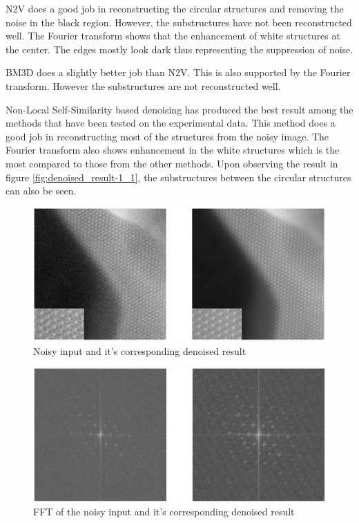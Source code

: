 \documentclass[fleqn,10pt]{wlscirep}
\begin{document}
N2V does a good job in reconstructing the circular structures and removing the noise in the black region. However, the substructures have not been reconstructed well. The Fourier transform shows that the enhancement of white structures at the center. The edges mostly look dark thus representing the suppression of noise. 

BM3D does a slightly better job than N2V. This is also supported by the Fourier transform. However the substructures are not reconstructed well. 

Non-Local Self-Similarity based denoising has produced the best result among the methods that have been tested on the experimental data. This method does a good job in reconstructing most of the structures from the noisy image. The Fourier transform also shows enhancement in the white structures which is the most compared to those from the other methods. Upon observing the result in figure \ref{fig:denoised_result-1_1}, the substructures between the circular structures can also be seen. 


\begin{figure}
	\centering
	\includegraphics[scale=0.5]{./imgs/denoised_result-1.png}
	\caption[Non-Local Self-Similarity based image denoising result]{Noisy input and it's corresponding denoised result}
	\label{fig:denoised_result-1}
\end{figure}

\begin{figure}
	\centering
	\includegraphics[scale=0.55]{./imgs/denoised_result_fft-1.png}
	\caption[FFT of the Non-Local Self-Similarity based image denoising result]{FFT of the noisy input and it's corresponding denoised result}
	\label{fig:denoised_result_fft-1}
\end{figure}
\end{document}
